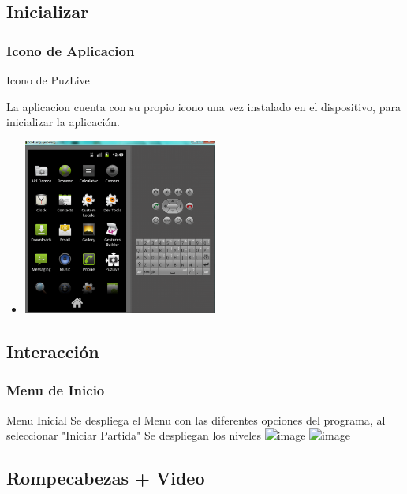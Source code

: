 \documentclass[serif,11pt]{beamer}
\begin{document}
		\subsection{Inicializar}


		\begin{frame}
			\frametitle{Icono de Aplicacion}

			\begin{block}{Icono de PuzLive}
					
				La aplicacion cuenta con su propio icono una vez instalado en el dispositivo, para inicializar la aplicaci\'on.
					\begin{itemize}
						 \pause
						\item  
						\includegraphics[width=0.5\textwidth]{outmenu} 
						\bigskip
					\end{itemize}
					
				\end{block}
		\end{frame}




		\subsection{Interacci\'on}
		\begin{frame}
			\frametitle{Menu de Inicio}
				\begin{block}{Menu Inicial}
				Se despliega el Menu con las diferentes opciones del programa, al seleccionar "Iniciar Partida" Se despliegan los niveles
				\includegraphics<1>[height=5cm]{menu1} 
				\includegraphics<2>[height=5cm]{puzzle6} 
				\end{block}
		\end{frame}

		
		
		\subsection{Rompecabezas + Video}
\end{document}

